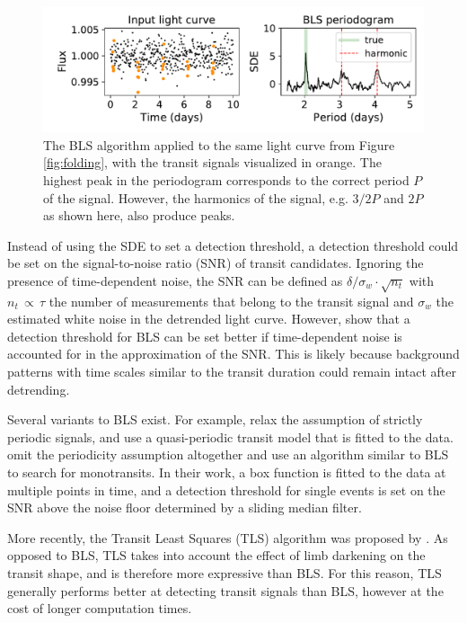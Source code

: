 \begin{figure}
    \centering
    \includegraphics[width=0.6\linewidth]{Background/Figures/BLS_example.pdf}
    \caption{The BLS algorithm applied to the same light curve from Figure \ref{fig:folding}, with the transit signals visualized in orange. The highest peak in the periodogram corresponds to the correct period $P$ of the signal. However, the harmonics of the signal, e.g. $3/2P$ and $2P$ as shown here, also produce peaks.}
    \label{fig:bls_example}
\end{figure}

Instead of using the SDE to set a detection threshold, a detection threshold could be set on the signal-to-noise ratio (SNR) of transit candidates. Ignoring the presence of time-dependent noise, the SNR can be defined as $\delta / \sigma_w \cdot \sqrt{n_t}$ with $n_t \,\propto\, \tau$ the number of measurements that belong to the transit signal and $\sigma_w$ the estimated white noise in the detrended light curve. However, \cite{pont2006effect} show that a detection threshold for BLS can be set better if time-dependent noise is accounted for in the approximation of the SNR. This is likely because background patterns with time scales similar to the transit duration could remain intact after detrending.

Several variants to BLS exist. For example, \cite{carter2013quasiperiodic} relax the assumption of strictly periodic signals, and use a quasi-periodic transit model that is fitted to the data. \cite{foreman2016population} omit the periodicity assumption altogether and use an algorithm similar to BLS to search for monotransits. In their work, a box function is fitted to the data at multiple points in time, and a detection threshold for single events is set on the SNR above the noise floor determined by a sliding median filter.

More recently, the Transit Least Squares (TLS) algorithm was proposed by \cite{hippke2019optimized}. As opposed to BLS, TLS takes into account the effect of limb darkening on the transit shape, and is therefore more expressive than BLS. For this reason, TLS generally performs better at detecting transit signals than BLS, however at the cost of longer computation times.

